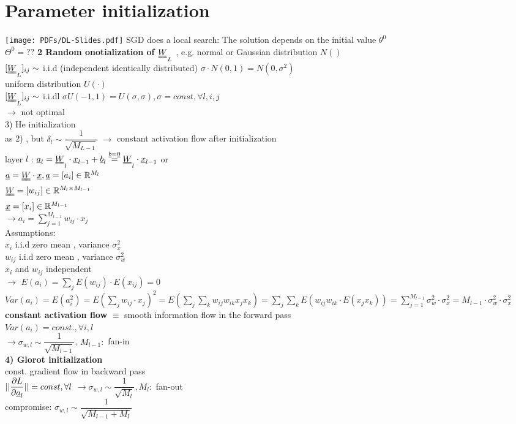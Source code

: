 \section{Parameter initialization}	
\texttt{[image: PDFs/DL-Slides.pdf]}
SGD does a local search: The solution depends on the initial value $  \theta ^0 $ \\
$  \Theta ^0 = ?? $
\textbf{2 Random onotialization of $ \W_L $} , e.g.
\textbullet normal or Gaussian distribution $ N() $\\
$ [ \W_L ]_{ij} \sim $ i.i.d (independent identically distributed) $  \sigma \cdot N(0,1) = N (0, \sigma^2)$\\
\textbullet uniform distribution $  U(\cdot) $ \\
$  [\W_L]_{ij} \sim  $ i.i.dl $  \sigma U(-1,1 ) = U(\sigma, \sigma) , \sigma = const, \forall l,i,j $ \\
$ \rightarrow $ not optimal \\
3) He initialization \\
as 2) , but $ \delta_l \sim \dfrac{1}{\sqrt{M_{L-1}}} $  $ \rightarrow $ constant activation flow after initialization \\
layer $  l $ : $ \a_l = \W_l \cdot \x _{l-1} + \b_{l} \overset {\b = \underline{0}}{=} \W_l \cdot \x_{l-1} $ or \\
$  \a = \W \cdot \x , \\
\a = [a_i] \in \R ^{M_l} $\\
$  \W = [w_{ij}] \in \R^{M_l \times M_{l-1}} $\\
$  {\underline x} = [x_i ] \in \mathbb R^{M_{l-1}} $\\
	$ \rightarrow  a_i = \sum_{j=1}^{M_{l-1}} w_{ij} \cdot x_j$\\
Assumptions:\\
\textbullet $ x_i  $ i.i.d zero mean , variance $  \sigma_x^2 $ \\
\textbullet $  w_{ij}  $  i.i.d zero mean , variance $  \sigma_w^2 $ \\
\textbullet $  x_i  $ and $  w_{ij} $ independent \\
$ \rightarrow $ \textbullet $  E(a_i) = \sum_{j}^{} E(w_{ij}) \cdot E(x _{ij} ) = 0$\\
\textbullet $  Var(a_i)  = E(a_i^2) = E (\sum_j w_{ij} \cdot x_j )^2 = E(\sum_j \sum_k w_{ij} w_{ik} x_{j} x_{k} ) = \sum_j \sum_k E(w_{ij} w_{ik} \cdot E(x_j x_k))  = \sum_{j=1}^{M_{l-1}} \sigma_w^2 \cdot \sigma_x^2 = M_{l-1} \cdot  \sigma_w^2 \cdot \sigma_x^2 $\\
\textbf{constant activation flow } $  \equiv  $ smooth information flow in the forward pass \\
$ Var (a_i) = const. , \forall i,l  $\\
$ \rightarrow \sigma_{w,l} \sim \dfrac{1}{\sqrt{M_{l-1}}}$, $ M_{l-1}:  $ fan-in\\
\textbf{4) Glorot initialization }\\
const. gradient flow in backward pass \\
$ ||  \dfrac{\partial L }{\partial {\underline a}_l}|| = const, \forall l$ $ \rightarrow  \sigma_{w,l} \sim \dfrac{1}{\sqrt{M_l}}, M_l:$ fan-out\\
compromise: $  \sigma_{w,l} \sim \dfrac{1}{\sqrt{M_{l-1} + M_l}} $
